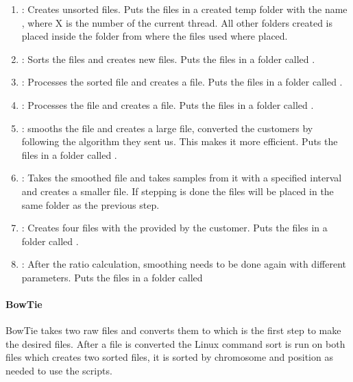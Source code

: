 \begin{enumerate}
\item {}: Creates unsorted  files. Puts the files in a
created temp folder with the name , where X is the number of the current thread. All other folders created is placed inside the folder from where the files used where placed.

\item {}: Sorts the  files and creates new 
files. Puts the files in a folder called .

\item {}: Processes the sorted  file and creates a
 file. Puts the files in a folder called .

\item {}: Processes the  file and creates a 
file. Puts the files in a folder called .

\item {}: smooths the file and creates a large  file,
converted the customers  by following the algorithm they  sent
us. This makes it more efficient. Puts the files in a folder called
.

\item {}: Takes the smoothed  file and takes samples from it
with a specified interval and creates a smaller  file. If stepping is done the files will be placed in the same folder as the previous step.

\item {}: Creates four  files with the
provided by the customer. Puts the files in a folder called .

\item {}: After the ratio calculation, smoothing needs to be done
again with different parameters. Puts the files in a folder called
\end{enumerate}



\paragraph{BowTie}
BowTie takes two raw  files and converts them to  which is the first step to make the desired  files. After a  file is converted the Linux command sort is run  on both files which creates two sorted  files, it is sorted by chromosome and position as needed to use the scripts.
